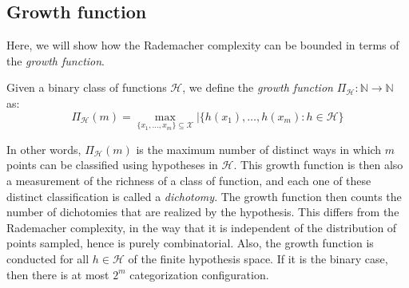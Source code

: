\subsection{Growth function}

Here, we will show how the Rademacher complexity can be bounded in terms of the \textit{growth function}. 
\begin{definition}
    Given a binary class of functions $\mathcal{H}$, we define the \textit{growth function} $\Pi_{\mathcal{H}}: \mathbb{N}\to \mathbb{N}$ as: 
    \begin{equation}
        \Pi_{\mathcal{H}} (m) = \max_{\{x_1, \dots, x_m\}\subseteq \mathcal{X}} \lvert \{h(x_1),\dots, h(x_m): h\in \mathcal{H}\}
    \end{equation} 
\end{definition}
In other words, $\Pi_{\mathcal{H}}(m)$ is the maximum number of distinct ways in which $m$ points can be classified using hypotheses in $\mathcal{H}$. This growth function is then also a measurement of the richness of a class of function, and each one of these distinct classification is called a \textit{dichotomy}. The growth function then counts the number of dichotomies that are realized by the hypothesis. This differs from the Rademacher complexity, in the way that it is independent of the distribution of points sampled, hence is purely combinatorial. Also, the growth function is conducted for all $h\in \mathcal{H}$ of the finite hypothesis space. If it is the binary case, then there is at most $2^{m}$ categorization configuration. 

